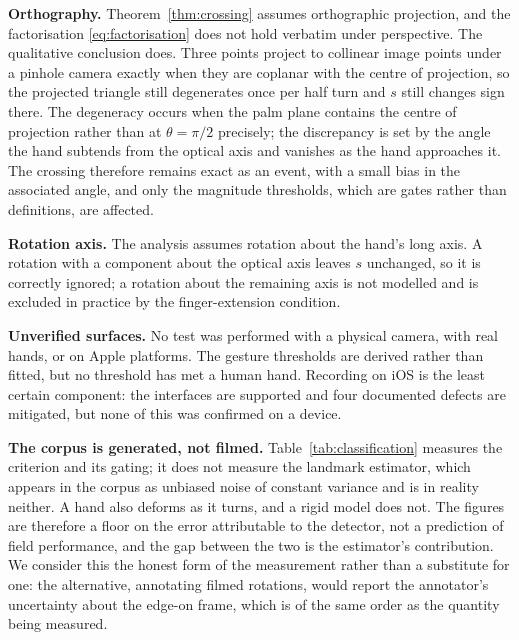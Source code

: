 \documentclass{article}
\theoremstyle{definition}
\begin{document}
\textbf{Orthography.} Theorem~\ref{thm:crossing} assumes orthographic
projection, and the factorisation \eqref{eq:factorisation} does not hold verbatim
under perspective. The qualitative conclusion does. Three points project to
collinear image points under a pinhole camera exactly when they are coplanar with
the centre of projection, so the projected triangle still degenerates once per
half turn and $s$ still changes sign there. The degeneracy occurs when the palm
plane contains the centre of projection rather than at $\theta = \pi/2$
precisely; the discrepancy is set by the angle the hand subtends from the optical
axis and vanishes as the hand approaches it. The crossing therefore remains
exact as an event, with a small bias in the associated angle, and only the
magnitude thresholds, which are gates rather than definitions, are affected.

\textbf{Rotation axis.} The analysis assumes rotation about the hand's long
axis. A rotation with a component about the optical axis leaves $s$ unchanged, so
it is correctly ignored; a rotation about the remaining axis is not modelled and
is excluded in practice by the finger-extension condition.

\textbf{Unverified surfaces.} No test was performed with a physical camera, with
real hands, or on Apple platforms. The gesture thresholds are derived rather than
fitted, but no threshold has met a human hand. Recording on iOS is the least
certain component: the interfaces are supported and four documented defects are
mitigated, but none of this was confirmed on a device.

\textbf{The corpus is generated, not filmed.} Table~\ref{tab:classification}
measures the criterion and its gating; it does not measure the landmark
estimator, which appears in the corpus as unbiased noise of constant variance and
is in reality neither. A hand also deforms as it turns, and a rigid model does
not. The figures are therefore a floor on the error attributable to the detector,
not a prediction of field performance, and the gap between the two is the
estimator's contribution. We consider this the honest form of the measurement
rather than a substitute for one: the alternative, annotating filmed rotations,
would report the annotator's uncertainty about the edge-on frame, which is of the
same order as the quantity being measured.
\end{document}
